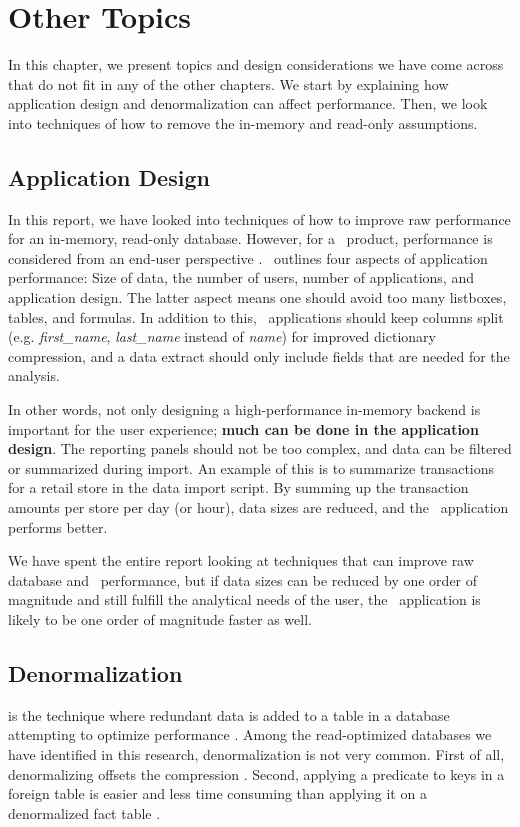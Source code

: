 \chapter{Other Topics}
\label{chap:Other Topics}
In this chapter, we present topics and design considerations we have come across that do not fit in any of the other chapters. We start by explaining how application design and denormalization can affect performance. Then, we look into techniques of how to remove the in-memory and read-only assumptions.


\newpage

\section{Application Design}
\label{sec:Application Design}
In this report, we have looked into techniques of how to improve raw performance for an in-memory, read-only database. However, for a \bd~product, performance is considered from an end-user perspective \cite{Qlik2011-yc}. \qlikview~outlines four aspects of application performance: Size of data, the number of users, number of applications, and application design. The latter aspect means one should avoid too many listboxes, tables, and formulas. In addition to this, \bd~applications should keep columns split (e.g. \textit{first\_name}, \textit{last\_name} instead of \textit{name}) for improved dictionary compression, and a data extract should only include fields that are needed for the analysis.


In other words, not only designing a high-performance in-memory backend is important for the user experience; \textbf{much can be done in the application design}. The reporting panels should not be too complex, and data can be filtered or summarized during import. An example of this is to summarize transactions for a retail store in the data import script. By summing up the transaction amounts per store per day (or hour), data sizes are reduced, and the \bd~application performs better.

We have spent the entire report looking at techniques that can improve raw database and \bd~performance, but if data sizes can be reduced by one order of magnitude and still fulfill the analytical needs of the user, the \bd~application is likely to be one order of magnitude faster as well.


\section{Denormalization}
\label{sec:Denormalization}
  is the technique where redundant data is added to a table in a database attempting to optimize performance \cite{Raman2008-gi, Wikipedia_contributors2015-az}. Among the read-optimized databases we have identified in this research, denormalization is not very common. First of all, denormalizing offsets the compression \cite{Barber2012-xt}. Second, applying a predicate to keys in a foreign table is easier and less time consuming than applying it on a denormalized fact table \cite{Abadi2008-dd}. 

